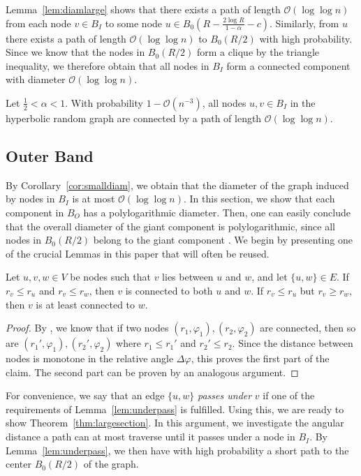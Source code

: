 \documentclass{llncs}
\newcommand{\Oh}{\mathcal{O}}
\newcommand{\thmref}[1]{Theorem~\ref{thm:#1}}
\newcommand{\lemref}[1]{Lemma~\ref{lem:#1}}
\newcommand{\corref}[1]{Corollary~\ref{cor:#1}}
\renewcommand{\leq}{\leqslant}
\renewcommand{\geq}{\geqslant}
\begin{document}
\lemref{diamlarge} shows that there exists a path of length $\Oh(\log \log n)$ from each node $v\in B_I$  to some node $u \in B_0(R - \tfrac{2\log R}{1-\alpha} -c)$. Similarly, from $u$ there exists a path of length $\Oh(\log \log n)$ to $B_0(R/2)$ with high probability. Since we know that the nodes in $B_0(R/2)$ form a clique by the triangle inequality, we therefore obtain that all nodes in $B_I$ form a connected component with diameter $\Oh(\log \log n)$.
\begin{corollary}
\label{cor:smalldiam}
Let $\tfrac12 < \alpha < 1$. With probability $1-\Oh(n^{-3})$, all nodes $u,v \in B_I$ in the hyperbolic random graph are connected by a path of length $\Oh(\log \log n)$.
\end{corollary} 

\subsection{Outer Band}
\label{sec:outer}

By \corref{smalldiam}, we obtain that the diameter of the graph induced by nodes in $B_I$ is at most $\Oh(\log\log n)$. In this section, we show that each component in $B_O$ has a polylogarithmic diameter. Then, one can easily conclude that the overall diameter of the giant component is polylogarithmic, since all nodes in $B_0(R/2)$ belong to the giant component \cite{bfmconnected}.
We begin by presenting one of the crucial Lemmas in this paper that will often be reused. 
\begin{lemma}
\label{lem:underpass}
Let $u,v,w \in V$ be nodes such that $v$ lies between $u$ and $w$, and let $\{u,w\} \in E$. If $r_v \leq r_u$ and $r_v \leq r_w$, then $v$ is connected to both $u$ and $w$. If $r_v \leq r_u$ but $r_v \geq r_w$, then $v$ is at least connected to $w$. 
\end{lemma}
\begin{proof}
By \cite[Lemma 5.28]{bfmconnected}, we know that if two nodes $(r_1, \varphi_1), (r_2,\varphi_2)$ are connected, then so are $(r_1', \varphi_1), (r_2', \varphi_2)$ where $r_1 \leq r_1'$ and $r_2' \leq r_2$. Since the distance between nodes is monotone in the relative angle $\Delta\varphi$, this proves the first part of the claim. The second part can be proven by an analogous argument.
\end{proof}
For convenience, we say that an edge $\{u,w\}$ {\em passes under} $v$ if one of the requirements of \lemref{underpass} is fulfilled. Using this, we are ready to show \thmref{largesection}. In this argument, we investigate the angular distance a path can at most traverse until it passes under a node in $B_I$. By \lemref{underpass}, we then have with high probability a short path to the center $B_0(R/2)$ of the graph.
\end{document}
